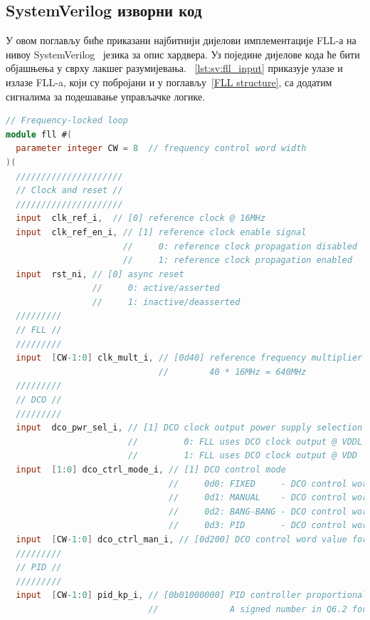 \documentclass[master]{finthesis}
\def \FLL  {FLL} %
\begin{document}
\subsection{SystemVerilog изворни код} \label{section:impl:systemVerilog}
У овом поглављу биће приказани најбитнији дијелови имплементације \FLL-а на нивоу SystemVerilog~\cite{SystemVerilog:1800-2023} језика за опис хардвера. Уз поједине дијелове кода ће бити објашњења у сврху лакшег разумијевања. \lstlistingname~\ref{lst:sv:fll_input} приказује улазе и излазе \FLL-a, који су побројани и у поглављу~\ref{FLL structure}, са додатим сигналима за подешавање управљачке логике. \par 
\begin{lstlisting}[language=Verilog, caption={Улазни и излазни сигнали (интерфејс) хијерархијски највишег \FLL\ модула.}, label={lst:sv:fll_input}]
 // Frequency-locked loop
module fll #(
  parameter integer CW = 8  // frequency control word width
)(
  /////////////////////
  // Clock and reset //
  /////////////////////
  input  clk_ref_i,  // [0] reference clock @ 16MHz
  input  clk_ref_en_i, // [1] reference clock enable signal
                       //     0: reference clock propagation disabled
                       //     1: reference clock propagation enabled
  input  rst_ni, // [0] async reset
                 //     0: active/asserted
                 //     1: inactive/deasserted
  /////////
  // FLL //
  /////////
  input  [CW-1:0] clk_mult_i, // [0d40] reference frequency multiplier (or frequency control word)
                              //        40 * 16MHz = 640MHz
  /////////
  // DCO //
  /////////
  input  dco_pwr_sel_i, // [1] DCO clock output power supply selection
                        //         0: FLL uses DCO clock output @ VDDL (~1.1V,     adjustable)
                        //         1: FLL uses DCO clock output @ VDD  (~1.2V, non-adjustable)
  input  [1:0] dco_ctrl_mode_i, // [1] DCO control mode
                                //     0d0: FIXED     - DCO control word is internally set to 0d203
                                //     0d1: MANUAL    - DCO control word is set via "dco_ctrl_man_i" register
                                //     0d2: BANG-BANG - DCO control word is set by a comparator and a counter
                                //     0d3: PID       - DCO control word is PID regulated
  input  [CW-1:0] dco_ctrl_man_i, // [0d200] DCO control word value for MANUAL mode
  /////////
  // PID //
  /////////
  input  [CW-1:0] pid_kp_i, // [0b01000000] PID controller proportional constant
                            //              A signed number in Q6.2 format (0b010000_00 == 0d16)

\end{lstlisting}
\end{document}
